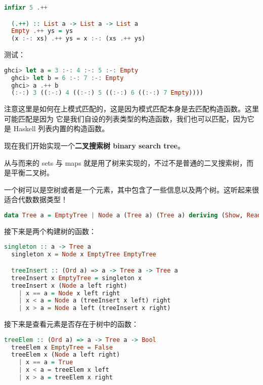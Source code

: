 \documentclass[./main.tex]{subfiles}
\begin{document}
\begin{lstlisting}[language=Haskell]
  infixr 5 .++

  (.++) :: List a -> List a -> List a
  Empty .++ ys = ys
  (x :-: xs) .++ ys = x :-: (xs .++ ys)
\end{lstlisting}

测试：

\begin{lstlisting}[language=Haskell]
  ghci> let a = 3 :-: 4 :-: 5 :-: Empty
  ghci> let b = 6 :-: 7 :-: Empty
  ghci> a .++ b
  (:-:) 3 ((:-:) 4 ((:-:) 5 ((:-:) 6 ((:-:) 7 Empty))))
\end{lstlisting}

注意这里是如何在上模式匹配的，这是因为模式匹配本身是去匹配构造函数。这里可能匹配\acode{:-:}是因为
它是我们自设的列表类型的构造函数，我们也可以匹配\acode{:}，因为它是 Haskell 列表内置的构造函数。

现在我们开始实现一个\textbf{二叉搜索树 binary search tree}。

从与而来的 sets 与 maps 就是用了树来实现的，不过不是普通的二叉搜索树，而是平衡二叉树。

一个树可以是空树或者是一个元素，其中包含了一些信息以及两个树。这听起来很适合代数数据类型！

\begin{lstlisting}[language=Haskell]
  data Tree a = EmptyTree | Node a (Tree a) (Tree a) deriving (Show, Read, Eq)
\end{lstlisting}

接下来是两个构建树的函数：

\begin{lstlisting}[language=Haskell]
  singleton :: a -> Tree a
  singleton x = Node x EmptyTree EmptyTree

  treeInsert :: (Ord a) => a -> Tree a -> Tree a
  treeInsert x EmptyTree = singleton x
  treeInsert x (Node a left right)
    | x == a = Node x left right
    | x < a = Node a (treeInsert x left) right
    | x > a = Node a left (treeInsert x right)
\end{lstlisting}

接下来是查看元素是否存在于树中的函数：

\begin{lstlisting}[language=Haskell]
  treeElem :: (Ord a) => a -> Tree a -> Bool
  treeElem x EmptyTree = False
  treeElem x (Node a left right)
    | x == a = True
    | x < a = treeElem x left
    | x > a = treeElem x right
\end{lstlisting}
\end{document}
